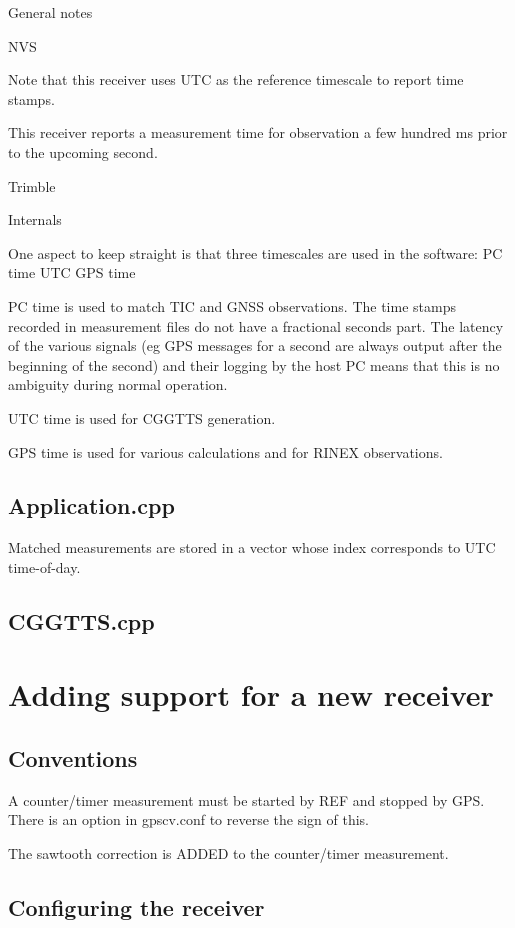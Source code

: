 
General notes

NVS

Note that this receiver uses UTC as the reference timescale to report time stamps.

This receiver reports a measurement time for observation a few hundred ms prior to the upcoming
second.

Trimble

 

Internals

One aspect to keep straight is that three timescales are used in the software:
PC time
UTC
GPS time

PC time is used to match TIC and GNSS observations. The time stamps recorded in measurement files do
not have a fractional seconds part. The latency of the various signals (eg GPS messages 
for a second are always output after the beginning of the second) and their logging by the host PC 
means that this is no ambiguity during normal operation.

UTC time is used for CGGTTS generation.

GPS time is used for various calculations and for RINEX observations.

\subsection{Application.cpp}

Matched measurements are stored in a vector whose index corresponds to UTC time-of-day.

\subsection{CGGTTS.cpp}


\section{Adding support for a new receiver}

\subsection{Conventions}

A counter/timer measurement must be started by REF and stopped by GPS.
There is an option in gpscv.conf to reverse the sign of this.

The sawtooth correction is ADDED to the counter/timer measurement.

\subsection{Configuring the receiver}

